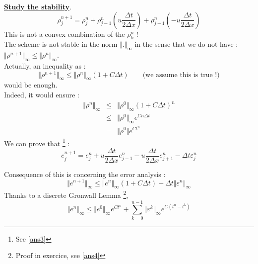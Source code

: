 \documentclass{report}
\theoremstyle{plain}
\theoremstyle{definition}
\theoremstyle{remark}
\begin{document}
\underline{\textbf{Study the stability}}. \\
\begin{equation}
\rho^{n+1}_j = \rho_j^n + \rho^n_{j-1}\left(u \frac{\Delta t}{2\Delta x} \right) + \rho^n_{j+1} \left(-u \frac{\Delta t}{2\Delta x} \right)
\end{equation}
This is not a convex combination of the $\rho^n_k$ !\\
The scheme is not stable in the norm $\Vert . \Vert_\infty$ in the sense that we do not have : $\Vert \rho^{n+1} \Vert_\infty \le \Vert \rho^{n} \Vert_\infty$. \\
Actually, an inequality as :
\begin{equation}
\Vert \rho^{n+1} \Vert_\infty \le \Vert \rho^{n} \Vert_\infty (1 + C\Delta t) \qquad \text{(we assume this is true !)}  
\end{equation}
would be enough.\\
Indeed, it would ensure :
\begin{eqnarray}
\Vert \rho^n \Vert_\infty & \le & \Vert \rho^0 \Vert_\infty (1 + C\Delta t)^n \\
& \le & \Vert \rho^0 \Vert_\infty e^{Cn\Delta t} \\
&=& \Vert \rho^0 \Vert e^{Ct^n}
\end{eqnarray}
We can prove that \footnote{See \ref{ans3}} :
\begin{equation}
e_j^{n+1} = e_j^n + u\frac{\Delta t }{2 \Delta x}e_{j-1}^n - u\frac{\Delta t }{2 \Delta x}e_{j+1}^n - \Delta t \varepsilon^n_j 
\end{equation}

Consequence of this is concerning the error analysis :
\begin{equation}
\Vert e^{n+1}\Vert_\infty \le \Vert e^{n}\Vert_\infty (1 + C\Delta t) + \Delta t \Vert \varepsilon^n \Vert_\infty  
\end{equation}
Thanks to a discrete Gronwall Lemma 
\footnote{Proof in exercice, see \ref{ans4}},
\begin{equation}
\Vert e^n \Vert_\infty \le \Vert e^0 \Vert_\infty e^{Ct^n} + \sum_{k=0}^{n-1} \Vert \varepsilon^k \Vert_\infty e^{C(t^n - t^k)}
\end{equation}
\end{document}

